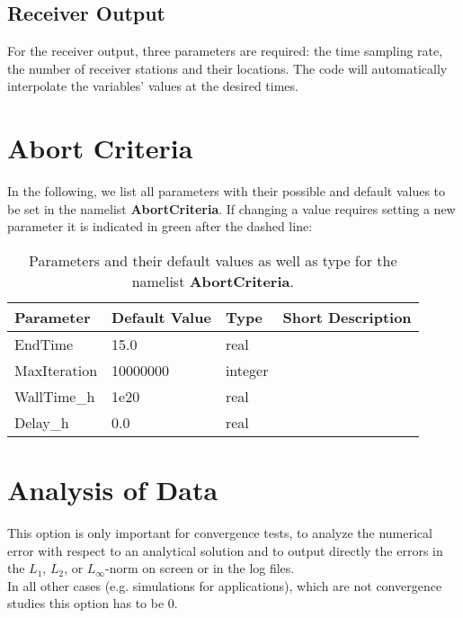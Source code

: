 \documentclass[12pt,twoside]{article}
\begin{document}
\subsection{Receiver Output}
\label{sec-block-rec}

For the receiver output, three parameters are required: 
the time sampling rate, the number of receiver stations and their locations. 
The code will automatically interpolate the variables' values at the desired times.

\newpage

\section{Abort Criteria}
\label{sec-block-abo}

In the following, we list all parameters with their possible and default values to be set in the namelist \textbf{AbortCriteria}.
If changing a value requires setting a new parameter it is indicated in green after the dashed line:\\

\begin{table}[H]
\caption{Parameters and their default values as well as type for the namelist \textbf{AbortCriteria}.}
\begin{center}
\begin{tabular}{|p{4cm}|p{2.7cm}|p{2cm}|p{4cm}|}
\hline
Parameter & Default Value & Type & Short Description \\
\hline
\hline
EndTime & 15.0 & real &  \\
MaxIteration & 10000000 & integer &  \\
WallTime\_h & 1e20 & real &  \\
Delay\_h & 0.0 & real &  \\
\hline
\end{tabular}
\end{center}
\label{abort-table}
\end{table}

\newpage



\section{Analysis of Data}
\label{sec-block-ana}

This option is only important for convergence tests, to analyze the numerical error with respect to
an analytical solution and to output directly the errors in the $L_1$, $L_2$, or $L_\infty$-norm on
screen or in the log files.\\
In all other cases (e.g. simulations for applications), which are not convergence studies this option
has to be $0$.
\end{document}
